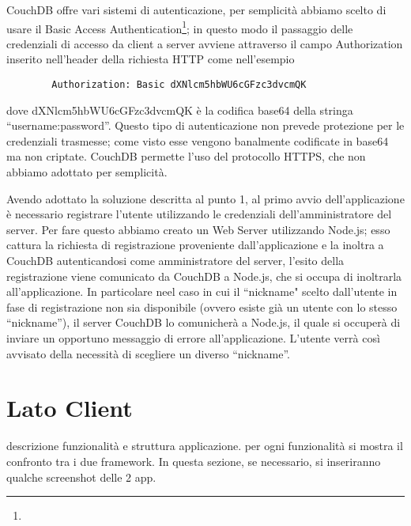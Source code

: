 		CouchDB offre vari sistemi di autenticazione, per semplicità abbiamo scelto 
		di usare il Basic Access Authentication\footnote{}; in questo modo il passaggio delle 
		credenziali di accesso da client a server avviene attraverso 
		il campo Authorization inserito nell'header della richiesta HTTP 
		come nell'esempio 
		\begin{lstlisting}
		Authorization: Basic dXNlcm5hbWU6cGFzc3dvcmQK
		\end{lstlisting}
		dove dXNlcm5hbWU6cGFzc3dvcmQK è la codifica base64 della stringa 
		``username:password''.
		Questo tipo di autenticazione non prevede protezione per le credenziali 
		trasmesse; come visto esse vengono banalmente codificate in base64 ma non 
		criptate. CouchDB permette l'uso del protocollo HTTPS, che non abbiamo adottato 
		per semplicità.
		
		Avendo adottato la soluzione descritta al punto 1, al primo avvio dell'applicazione 
		è necessario registrare l'utente utilizzando le credenziali dell'amministratore 
		del server. Per fare questo abbiamo creato un Web Server utilizzando Node.js; 
		esso cattura la richiesta di registrazione proveniente dall'applicazione 
		e la inoltra a CouchDB autenticandosi come amministratore del server, 
		l'esito della registrazione viene comunicato da CouchDB a Node.js, che 
		si occupa di inoltrarla all'applicazione. In particolare neel caso in cui il ``nickname"
		scelto dall'utente in fase di registrazione non sia disponibile 
		(ovvero esiste già un utente con lo stesso ``nickname''), il server CouchDB 
		lo comunicherà a Node.js, il quale si occuperà di inviare un opportuno 
		messaggio di errore all'applicazione. L'utente verrà così avvisato della 
		necessità di scegliere un diverso ``nickname''.
		
	\section{Lato Client}
		descrizione funzionalità e struttura applicazione. per ogni funzionalità
		si mostra il confronto tra i due framework. In questa sezione, se 
		necessario, si inseriranno qualche screenshot delle 2 app.
